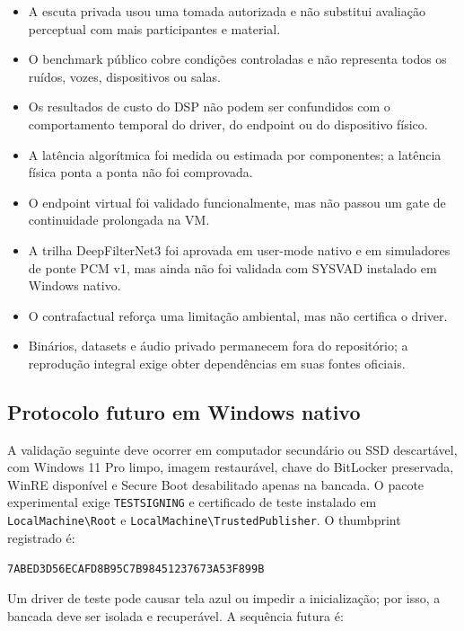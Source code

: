 \begin{itemize}
    \item A escuta privada usou uma tomada autorizada e não substitui avaliação perceptual com mais participantes e material.
    \item O benchmark público cobre condições controladas e não representa todos os ruídos, vozes, dispositivos ou salas.
    \item Os resultados de custo do DSP não podem ser confundidos com o comportamento temporal do driver, do endpoint ou do dispositivo físico.
    \item A latência algorítmica foi medida ou estimada por componentes; a latência física ponta a ponta não foi comprovada.
    \item O endpoint virtual foi validado funcionalmente, mas não passou um gate de continuidade prolongada na VM.
    \item A trilha DeepFilterNet3 foi aprovada em user-mode nativo e em simuladores de ponte PCM v1, mas ainda não foi validada com SYSVAD instalado em Windows nativo.
    \item O contrafactual reforça uma limitação ambiental, mas não certifica o driver.
    \item Binários, datasets e áudio privado permanecem fora do repositório; a reprodução integral exige obter dependências em suas fontes oficiais.
\end{itemize}

\subsection{Protocolo futuro em Windows nativo}

A validação seguinte deve ocorrer em computador secundário ou SSD descartável, com Windows 11 Pro limpo, imagem restaurável, chave do BitLocker preservada, WinRE disponível e Secure Boot desabilitado apenas na bancada. O pacote experimental exige \texttt{TESTSIGNING} e certificado de teste instalado em \texttt{LocalMachine\textbackslash Root} e \texttt{LocalMachine\textbackslash TrustedPublisher}. O thumbprint registrado é:

\begin{center}
\texttt{7ABED3D56ECAFD8B95C7B98451237673A53F899B}
\end{center}

Um driver de teste pode causar tela azul ou impedir a inicialização; por isso, a bancada deve ser isolada e recuperável. A sequência futura é:

